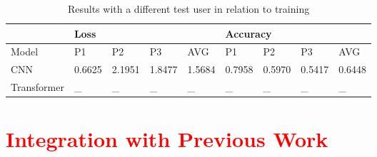 \begin{table}[H]
\caption{Results with a different test user in relation to training}
\label{table:results_2vs1_user}
\centering
\begin{tabular}{|l|l|l|l|l|l|l|l|l|} 
\hline
& \multicolumn{4}{|l|}{Loss} & \multicolumn{4}{|l|}{Accuracy} \\
\hline
Model & P1 & P2 & P3 & AVG & P1 & P2 & P3 & AVG \\
\hline
CNN & 0.6625 & 2.1951 & 1.8477 & 1.5684 & 0.7958 & 0.5970 & 0.5417 & 0.6448 \\
\hline
Transformer & \_ & \_ & \_ & \_ & \_ & \_ & \_ & \_ \\
\hline
\end{tabular}
\end{table}

\section{\textcolor{red}{Integration with Previous Work}}
